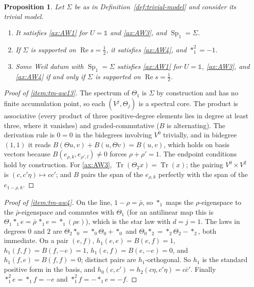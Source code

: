 \documentclass[11pt]{amsart}
\theoremstyle{plain}
\newtheorem{proposition}[theorem]{Proposition}
\theoremstyle{definition}
\theoremstyle{remark}
\numberwithin{equation}{section}
\DeclareMathOperator{\Tr}{Tr}
\DeclareMathOperator{\Rea}{Re}
\renewcommand{\Re}{\Rea}
\begin{document}
\begin{proposition}\label{prop:trivial-model}
Let $\Sigma$ be as in Definition~\ref{def:trivial-model} and consider
its trivial model.
\begin{enumerate}[label=(\roman*)]
\item\label{item:tm-aw13} It satisfies \ref{ax:AW1} for $U=\mathbb 1$
  and \ref{ax:AW3}, and $\operatorname{Sp}_1=\Sigma$.
\item\label{item:tm-aw4} If $\Sigma$ is supported on $\Re s=\tfrac12$,
  it satisfies \ref{ax:AW4}, and $*_1^2=-1$.
\item\label{item:tm-iff} Some Weil datum with $\operatorname{Sp}_1=
  \Sigma$ satisfies \ref{ax:AW1} for $U=\mathbb 1$, \ref{ax:AW3}, and
  \ref{ax:AW4} if and only if $\Sigma$ is supported on $\Re s=\tfrac12$.
\end{enumerate}
\end{proposition}

\begin{proof}[Proof of \ref{item:tm-aw13}]
The spectrum of $\Theta_1$ is $\Sigma$ by construction and has no finite
accumulation point, so each $(V^j,\Theta_j)$ is a spectral core. The
product is associative (every product of three positive-degree elements
lies in degree at least three, where it vanishes) and
graded-commutative ($B$ is alternating). The derivation rule is
$0=0$ in the bidegrees involving $V^0$ trivially, and in bidegree
$(1,1)$ it reads $B(\Theta u,v)+B(u,\Theta v)=B(u,v)$, which holds on
basis vectors because $B(e_{\rho,k},e_{\rho',l})\ne0$ forces
$\rho+\rho'=1$. The endpoint conditions hold by construction. For
\ref{ax:AW3}, $\Tr(\Theta_2x)=\Tr(x)$; the pairing $V^0\times V^2$ is
$(c,c'\eta)\mapsto cc'$; and $B$ pairs the span of the
$e_{\rho,k}$ perfectly with the span of the $e_{1-\rho,k}$.
\end{proof}

\begin{proof}[Proof of \ref{item:tm-aw4}]
On the line, $1-\rho=\bar\rho$, so $*_1$ maps the $\rho$-eigenspace to
the $\bar\rho$-eigenspace and commutes with $\Theta_1$ (for an
antilinear map this is $\Theta_1*_1e=\bar\rho\,*_1e=*_1(\rho e)$), which
is the star law with $d=j=1$. The laws in degrees $0$ and $2$ are
$\Theta_2*_0=*_0\Theta_0+*_0$ and $\Theta_0*_2=*_2\Theta_2-*_2$, both
immediate. On a pair $(e,f)$, $h_1(e,e)=B(e,f)=1$,
$h_1(f,f)=B(f,-e)=1$, $h_1(e,f)=B(e,-e)=0$, and $h_1(f,e)=B(f,f)=0$;
distinct pairs are $h_1$-orthogonal. So $h_1$ is the standard positive
form in the basis, and $h_0(c,c')=h_2(c\eta,c'\eta)=c\bar c'$. Finally
$*_1^2e=*_1f=-e$ and $*_1^2f=-*_1e=-f$.
\end{proof}
\end{document}
